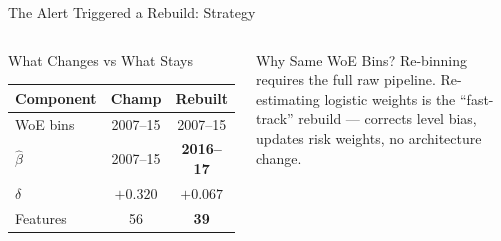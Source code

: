 \documentclass[aspectratio=169,11pt]{beamer}
\newcommand{\B}[1]{\textbf{#1}}
\begin{document}
\begin{frame}[shrink=8]{The Alert Triggered a Rebuild: Strategy}
\begin{columns}[T]
      \begin{block}{What Changes vs What Stays}\footnotesize
        \begin{tabular}{lcc}
          \toprule
          \textbf{Component} & \textbf{Champ} & \textbf{Rebuilt} \\
          \midrule
          WoE bins   & 2007--15 & 2007--15 \\
          $\hat\beta$ & 2007--15 & \B{2016--17} \\
          $\delta$   & $+0.320$ & \B{$+0.067$} \\
          Features   & 56 & \B{39} \\
          \bottomrule
        \end{tabular}
      \end{block}
      \vspace{3pt}
      \begin{exampleblock}{Why Same WoE Bins?}\footnotesize
        Re-binning requires the full raw pipeline. Re-estimating logistic weights is the ``fast-track'' rebuild --- corrects level bias, updates risk weights, no architecture change.
      \end{exampleblock}
  \end{columns}
\end{frame}
\end{document}
